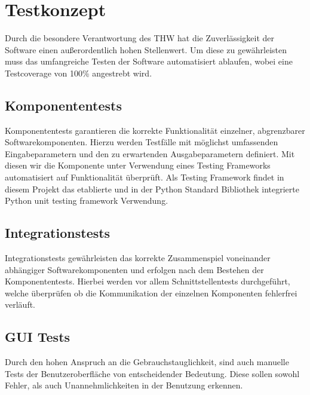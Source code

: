 \section{Testkonzept}
Durch die besondere Verantwortung des THW hat die Zuverlässigkeit der Software einen außerordentlich hohen Stellenwert. Um diese zu gewährleisten muss das umfangreiche Testen der Software automatisiert ablaufen, wobei eine Testcoverage von 100\% angestrebt wird. 
\subsection{Komponententests}
Komponententests garantieren die korrekte Funktionalität einzelner, abgrenzbarer Softwarekomponenten. Hierzu werden Testfälle mit möglichst umfassenden Eingabeparametern und den zu erwartenden Ausgabeparametern definiert. Mit diesen wir die Komponente unter Verwendung eines Testing Frameworks automatisiert auf Funktionalität überprüft. Als Testing Framework findet in diesem Projekt das etablierte und in der Python Standard Bibliothek integrierte Python unit testing framework Verwendung.
\subsection{Integrationstests} 
Integrationstests gewährleisten das korrekte Zusammenspiel voneinander abhängiger Softwarekomponenten und erfolgen nach dem Bestehen der Komponententests. Hierbei werden vor allem Schnittstellentests durchgeführt, welche überprüfen ob die Kommunikation der einzelnen Komponenten fehlerfrei verläuft.
\subsection{GUI Tests}
Durch den hohen Anspruch an die Gebrauchstauglichkeit, sind auch manuelle Tests der Benutzeroberfläche von entscheidender Bedeutung. Diese sollen sowohl Fehler, als auch Unannehmlichkeiten in der Benutzung erkennen.